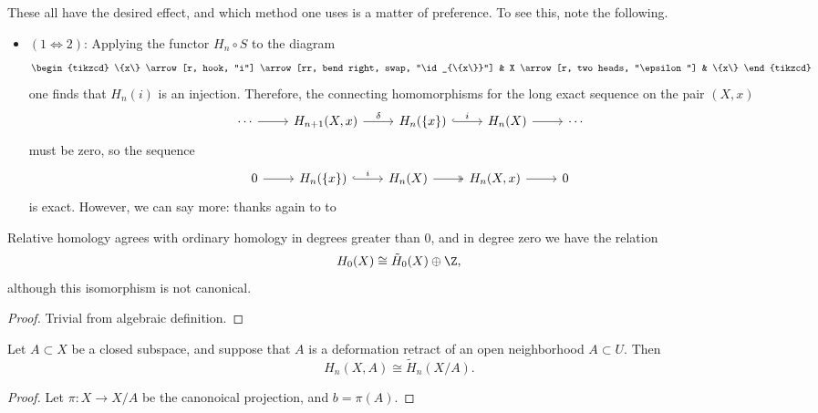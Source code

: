 \documentclass[main.tex]{subfiles}
\begin{document}
These all have the desired effect, and which method one uses is a matter of preference. To see this, note the following.
\begin{itemize}
  \item $(1 \Leftrightarrow 2)$: Applying the functor $H_{n} \circ S$ to the diagram
    \begin{equation*}
      \begin{tikzcd}
        \{x\}
        \arrow[r, hook, "i"]
        \arrow[rr, bend right, swap, "\id_{\{x\}}"]
        & X
        \arrow[r, two heads, "\epsilon"]
        & \{x\}
      \end{tikzcd}
    \end{equation*}
    one finds that $H_{n}(i)$ is an injection. Therefore, the connecting homomorphisms for the long exact sequence on the pair $(X, x)$
    \begin{equation*}
      \begin{tikzcd}
        \cdots
        \arrow[r]
        & H_{n+1}(X, x)
        \arrow[r, "\delta"]
        & H_{n}(\{x\})
        \arrow[r, hook, "i"]
        & H_{n}(X)
        \arrow[r]
        & \cdots
      \end{tikzcd}
    \end{equation*}
    must be zero, so the sequence
    \begin{equation*}
      \begin{tikzcd}
        0
        \arrow[r]
        & H_{n}(\{x\})
        \arrow[r, hook, "i"]
        & H_{n}(X)
        \arrow[r, two heads]
        & H_{n}(X, x)
        \arrow[r]
        & 0
      \end{tikzcd}
    \end{equation*}
    is exact. However, we can say more: thanks again to to
\end{itemize}

\begin{proposition}
  Relative homology agrees with ordinary homology in degrees greater than 0, and in degree zero we have the relation
  \begin{equation*}
    H_{0}(X) \cong \tilde{H}_{0}(X) \oplus \Z,
  \end{equation*}
  although this isomorphism is not canonical.
\end{proposition}
\begin{proof}
  Trivial from algebraic definition.
\end{proof}

\begin{proposition}
  Let $A \subset X$ be a closed subspace, and suppose that $A$ is a deformation retract of an open neighborhood $A \subset U$. Then
  \begin{equation*}
    H_{n}(X, A) \cong \tilde{H}_{n}(X/A).
  \end{equation*}
\end{proposition}
\begin{proof}
  Let $\pi\colon X \to X/A$ be the canonoical projection, and $b = \pi(A)$.
\end{proof}
\end{document}
